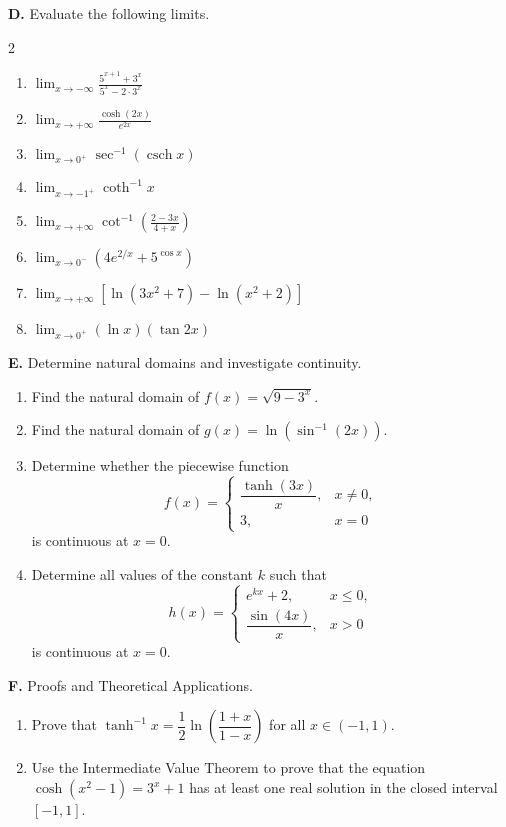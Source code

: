 \pagebreak 

\noindent\textbf{D.} Evaluate the following limits.

\begin{multicols}{2}
\begin{enumerate}[label=\arabic*., start=15, nosep, topsep=0pt, itemsep=2pt]
    \item \(\displaystyle\lim_{x \to -\infty} \frac{5^{x+1} + 3^x}{5^x - 2 \cdot 3^x}\)
    \item \(\displaystyle\lim_{x \to +\infty} \frac{\cosh(2x)}{e^{2x}}\)
    \item \(\displaystyle\lim_{x \to 0^+} \sec^{-1}(\operatorname{csch} x)\)
    \item \(\displaystyle\lim_{x \to -1^+} \coth^{-1} x\)
    \item \(\displaystyle\lim_{x \to +\infty} \cot^{-1}\!\left(\frac{2 - 3x}{4 + x}\right)\)
    \item \(\displaystyle\lim_{x \to 0^-} \left(4e^{2/x} + 5^{\cos x}\right)\)
    \item \(\displaystyle\lim_{x \to +\infty} \left[ \ln(3x^2 + 7) - \ln(x^2 + 2) \right]\)
    \item \(\displaystyle\lim_{x \to 0^+} (\ln x)(\tan 2x)\)
\end{enumerate}
\end{multicols}

\medskip
\noindent\textbf{E.} Determine natural domains and investigate continuity.

\begin{enumerate}[label=\arabic*., start=23, nosep, topsep=0pt, itemsep=2pt]
    \item Find the natural domain of \(f(x) = \sqrt{9 - 3^x}\).
    \item Find the natural domain of \(g(x) = \ln(\sin^{-1}(2x))\).
    \item Determine whether the piecewise function
    \[
    f(x) = \begin{cases}
    \dfrac{\tanh(3x)}{x}, & x \neq 0, \\[8pt]
    3, & x = 0
    \end{cases}
    \]
    is continuous at \(x = 0\).
    \item Determine all values of the constant \(k\) such that
    \[
    h(x) = \begin{cases}
    e^{kx} + 2, & x \le 0, \\[4pt]
    \dfrac{\sin(4x)}{x}, & x > 0
    \end{cases}
    \]
    is continuous at \(x = 0\).
\end{enumerate}

\medskip
\noindent\textbf{F.} Proofs and Theoretical Applications.

\begin{enumerate}[label=\arabic*., start=27, nosep, topsep=0pt, itemsep=2pt]
    \item Prove that \(\tanh^{-1} x = \dfrac{1}{2}\ln\!\left(\dfrac{1+x}{1-x}\right)\) for all \(x \in (-1, 1)\).
    \item Use the Intermediate Value Theorem to prove that the equation \(\cosh(x^2 - 1) = 3^x + 1\) has at least one real solution in the closed interval \([-1, 1]\).
\end{enumerate}